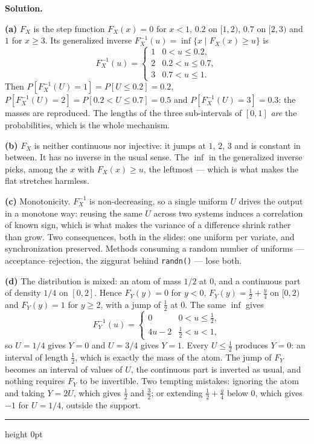\documentclass[11pt]{article}
\newenvironment{solution}
    {\par\nobreak\smallskip\noindent\textbf{Solution.}\par\nobreak\smallskip}
    {\par\medskip\hrule height 0pt\medskip}
\begin{document}
\begin{solution}
\textbf{(a)} $F_X$ is the step function $F_X(x) = 0$ for $x < 1$, $0.2$ on $[1,2)$, $0.7$ on $[2,3)$ and $1$ for $x \geq 3$. Its generalized inverse $F_X^{-1}(u) = \inf\lbrace x \mid F_X(x) \geq u \rbrace$ is
\[
F_X^{-1}(u) =
\begin{cases}
1 & 0 < u \leq 0.2, \\
2 & 0.2 < u \leq 0.7, \\
3 & 0.7 < u \leq 1 .
\end{cases}
\]
Then $P[F_X^{-1}(U) = 1] = P[U \leq 0.2] = 0.2$, $P[F_X^{-1}(U) = 2] = P[0.2 < U \leq 0.7] = 0.5$ and $P[F_X^{-1}(U) = 3] = 0.3$: the masses are reproduced. The lengths of the three sub-intervals of $[0,1]$ {\it are} the probabilities, which is the whole mechanism.

\textbf{(b)} $F_X$ is neither continuous nor injective: it jumps at $1$, $2$, $3$ and is constant in between. It has no inverse in the usual sense. The $\inf$ in the generalized inverse picks, among the $x$ with $F_X(x) \geq u$, the leftmost --- which is what makes the flat stretches harmless.

\textbf{(c)} {\red Monotonicity}. $F_X^{-1}$ is non-decreasing, so a single uniform $U$ drives the output in a monotone way: reusing the same $U$ across two systems induces a correlation of known sign, which is what makes the variance of a difference shrink rather than grow. Two consequences, both in the slides: one uniform per variate, and synchronization preserved. Methods consuming a random number of uniforms --- acceptance--rejection, the ziggurat behind \texttt{randn()} --- lose both.

\textbf{(d)} The distribution is {\red mixed}: an atom of mass $1/2$ at $0$, and a continuous part of density $1/4$ on $[0,2]$. Hence $F_Y(y) = 0$ for $y < 0$, $F_Y(y) = \frac12 + \frac{y}{4}$ on $[0,2)$ and $F_Y(y) = 1$ for $y \geq 2$, with a jump of $\frac12$ at $0$. The same $\inf$ gives
\[
F_Y^{-1}(u) =
\begin{cases}
0 & 0 < u \leq \frac12, \\
4u - 2 & \frac12 < u < 1,
\end{cases}
\]
so $U = 1/4$ gives $Y = 0$ and $U = 3/4$ gives $Y = 1$. Every $U \leq \frac12$ produces $Y = 0$: an interval of length $\frac12$, which is exactly the mass of the atom. The jump of $F_Y$ becomes an interval of values of $U$, the continuous part is inverted as usual, and nothing requires $F_Y$ to be invertible. Two tempting mistakes: ignoring the atom and taking $Y = 2U$, which gives $\frac12$ and $\frac32$; or extending $\frac12 + \frac{y}{4}$ below $0$, which gives $-1$ for $U = 1/4$, outside the support.
\end{solution}
\end{document}
